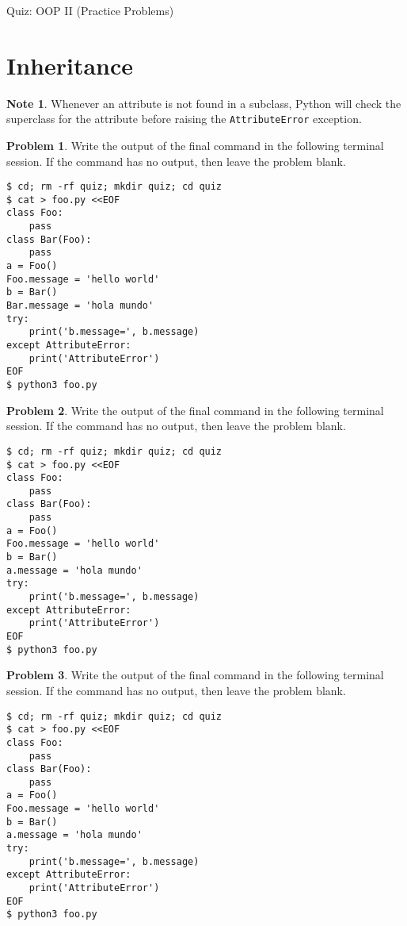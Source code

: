 \documentclass[10pt]{article}
\theoremstyle{definition}
\newtheorem{problem}{Problem}
\newtheorem{note}{Note}
\begin{document}
\begin{center}
    {
\Large
    Quiz: OOP II (Practice Problems)
}

    \vspace{0.1in}
\end{center}

\filbreak
\section{Inheritance}

\begin{note}
    Whenever an attribute is not found in a subclass,
    Python will check the superclass for the attribute before raising the \lstinline{AttributeError} exception.
\end{note}

\filbreak
\begin{problem}
    Write the output of the final command in the following terminal session.
    If the command has no output, then leave the problem blank.
\end{problem}
\begin{lstlisting}
$ cd; rm -rf quiz; mkdir quiz; cd quiz
$ cat > foo.py <<EOF
class Foo:
    pass
class Bar(Foo):
    pass
a = Foo()
Foo.message = 'hello world'
b = Bar()
Bar.message = 'hola mundo'
try:
    print('b.message=', b.message)
except AttributeError:
    print('AttributeError') 
EOF
$ python3 foo.py
\end{lstlisting}


\filbreak
\begin{problem}
    Write the output of the final command in the following terminal session.
    If the command has no output, then leave the problem blank.
\end{problem}
\begin{lstlisting}
$ cd; rm -rf quiz; mkdir quiz; cd quiz
$ cat > foo.py <<EOF
class Foo:
    pass
class Bar(Foo):
    pass
a = Foo()
Foo.message = 'hello world'
b = Bar()
a.message = 'hola mundo'
try:
    print('b.message=', b.message)
except AttributeError:
    print('AttributeError') 
EOF
$ python3 foo.py
\end{lstlisting}


\filbreak
\begin{problem}
    Write the output of the final command in the following terminal session.
    If the command has no output, then leave the problem blank.
\end{problem}
\begin{lstlisting}
$ cd; rm -rf quiz; mkdir quiz; cd quiz
$ cat > foo.py <<EOF
class Foo:
    pass
class Bar(Foo):
    pass
a = Foo()
Foo.message = 'hello world'
b = Bar()
a.message = 'hola mundo'
try:
    print('b.message=', b.message)
except AttributeError:
    print('AttributeError') 
EOF
$ python3 foo.py
\end{lstlisting}
\end{document}
